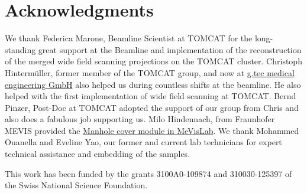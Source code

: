 \documentclass[%
	paper=a4,%
	abstract=true,%
	]{scrartcl}
\begin{document}
\clearpage
\section{Acknowledgments}
We thank Federica Marone, Beamline Scientist at TOMCAT for the long-standing great support at the Beamline and implementation of the reconstruction of the merged wide field scanning projections on the TOMCAT cluster. Christoph Hinterm\"{u}ller, former member of the TOMCAT group, and now at \href{http://gtec.at/}{g.tec medical engineering GmbH} also helped us during countless shifts at the beamline. He also helped with the first implementation of wide field scanning at TOMCAT. Bernd Pinzer, Post-Doc at TOMCAT adopted the support of our group from Chris and also does a fabulous job supporting us. Milo Hindennach, from Fraunhofer MEVIS provided the \href{http://www.mevis-research.de/cgi-bin/discus/board-auth.cgi?lm=1282233250&file=/839/11760.html}{Manhole cover module in MeVisLab}.  We thank Mohammed Ouanella and Eveline Yao, our former and current lab technicians for expert technical assistance and embedding of the samples.

This work has been funded by the grants 3100A0-109874 and 310030-125397 of the Swiss National Science Foundation.

\clearpage


\end{document}
